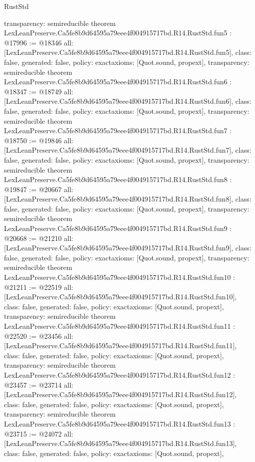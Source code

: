 \begin{lexlean}{RustStd}
\begin{coremodule}
{  transparency: semireducible
}
theorem LexLeanPreserve.Ca5fe8b9d64595a79eee4f004915717bd.R14.RustStd.fun5 : @17996 := @18346 {
  all: [LexLeanPreserve.Ca5fe8b9d64595a79eee4f004915717bd.R14.RustStd.fun5],
  class: false,
  generated: false,
  policy: exact{axioms: [Quot.sound, propext]},
  transparency: semireducible
}
theorem LexLeanPreserve.Ca5fe8b9d64595a79eee4f004915717bd.R14.RustStd.fun6 : @18347 := @18749 {
  all: [LexLeanPreserve.Ca5fe8b9d64595a79eee4f004915717bd.R14.RustStd.fun6],
  class: false,
  generated: false,
  policy: exact{axioms: [Quot.sound, propext]},
  transparency: semireducible
}
theorem LexLeanPreserve.Ca5fe8b9d64595a79eee4f004915717bd.R14.RustStd.fun7 : @18750 := @19846 {
  all: [LexLeanPreserve.Ca5fe8b9d64595a79eee4f004915717bd.R14.RustStd.fun7],
  class: false,
  generated: false,
  policy: exact{axioms: [Quot.sound, propext]},
  transparency: semireducible
}
theorem LexLeanPreserve.Ca5fe8b9d64595a79eee4f004915717bd.R14.RustStd.fun8 : @19847 := @20667 {
  all: [LexLeanPreserve.Ca5fe8b9d64595a79eee4f004915717bd.R14.RustStd.fun8],
  class: false,
  generated: false,
  policy: exact{axioms: [Quot.sound, propext]},
  transparency: semireducible
}
theorem LexLeanPreserve.Ca5fe8b9d64595a79eee4f004915717bd.R14.RustStd.fun9 : @20668 := @21210 {
  all: [LexLeanPreserve.Ca5fe8b9d64595a79eee4f004915717bd.R14.RustStd.fun9],
  class: false,
  generated: false,
  policy: exact{axioms: [Quot.sound, propext]},
  transparency: semireducible
}
theorem LexLeanPreserve.Ca5fe8b9d64595a79eee4f004915717bd.R14.RustStd.fun10 : @21211 := @22519 {
  all: [LexLeanPreserve.Ca5fe8b9d64595a79eee4f004915717bd.R14.RustStd.fun10],
  class: false,
  generated: false,
  policy: exact{axioms: [Quot.sound, propext]},
  transparency: semireducible
}
theorem LexLeanPreserve.Ca5fe8b9d64595a79eee4f004915717bd.R14.RustStd.fun11 : @22520 := @23456 {
  all: [LexLeanPreserve.Ca5fe8b9d64595a79eee4f004915717bd.R14.RustStd.fun11],
  class: false,
  generated: false,
  policy: exact{axioms: [Quot.sound, propext]},
  transparency: semireducible
}
theorem LexLeanPreserve.Ca5fe8b9d64595a79eee4f004915717bd.R14.RustStd.fun12 : @23457 := @23714 {
  all: [LexLeanPreserve.Ca5fe8b9d64595a79eee4f004915717bd.R14.RustStd.fun12],
  class: false,
  generated: false,
  policy: exact{axioms: [Quot.sound, propext]},
  transparency: semireducible
}
theorem LexLeanPreserve.Ca5fe8b9d64595a79eee4f004915717bd.R14.RustStd.fun13 : @23715 := @24072 {
  all: [LexLeanPreserve.Ca5fe8b9d64595a79eee4f004915717bd.R14.RustStd.fun13],
  class: false,
  generated: false,
  policy: exact{axioms: [Quot.sound, propext]},
}
\end{coremodule}
\end{lexlean}
